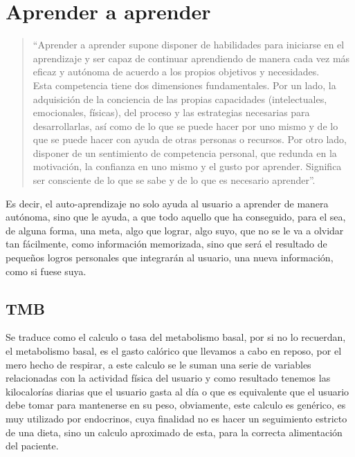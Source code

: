 \section{Aprender a aprender}
\begin{quote}
“Aprender a aprender supone disponer de habilidades para iniciarse en el aprendizaje y ser capaz de continuar aprendiendo de manera cada vez más eficaz y autónoma de acuerdo a los propios objetivos y necesidades.\\

Esta competencia tiene dos dimensiones fundamentales. Por un lado, la adquisición de la conciencia de las propias capacidades (intelectuales, emocionales, físicas), del proceso y las estrategias necesarias para desarrollarlas, así como de lo que se puede hacer por uno mismo y de lo que se puede hacer con ayuda de otras personas o recursos. Por otro lado, disponer de un sentimiento de competencia personal, que redunda en la motivación, la confianza en uno mismo y el gusto por aprender. Significa ser consciente de lo que se sabe y de lo que es necesario aprender”. \cite{aprederAAprender}


\end{quote}

Es decir, el auto-aprendizaje no solo ayuda al usuario a aprender de manera autónoma, sino que le ayuda, a que todo aquello que ha conseguido, para el sea, de alguna forma, una meta, algo que lograr, algo suyo, que no se le va a olvidar tan fácilmente, como información memorizada, sino que será el resultado de pequeños logros personales que integrarán al usuario, una nueva información, como si fuese suya.
\subsection{TMB}
Se traduce como el calculo o tasa del metabolismo basal, por si no lo recuerdan, el metabolismo basal, es el gasto calórico que llevamos a cabo en reposo, por el mero hecho de respirar, a este calculo se le suman una serie de variables relacionadas con la actividad física del usuario y como resultado tenemos las kilocalorías diarias que el usuario gasta al día o que es equivalente que el usuario debe tomar para mantenerse en su peso, obviamente, este calculo es genérico, es muy utilizado por endocrinos, cuya finalidad no es hacer un seguimiento estricto de una dieta, sino un calculo aproximado de esta, para la correcta alimentación del paciente.\\

